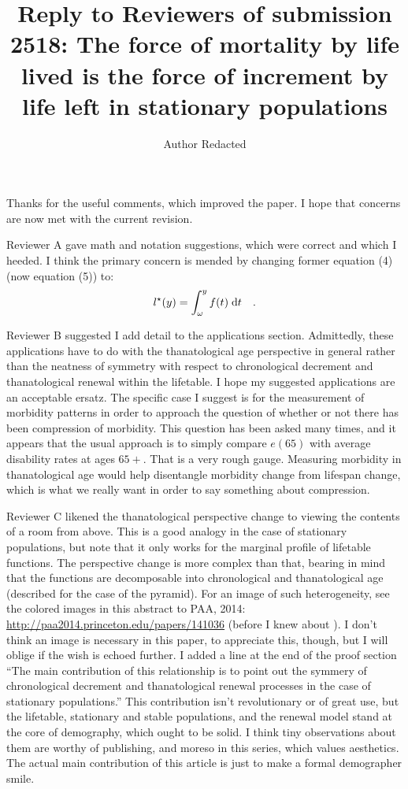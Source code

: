 \documentclass{article}
\newcommand{\dd}{\; \mathrm{d}}
\begin{document}
\title{Reply to Reviewers of submission 2518: The force of mortality by life
lived is the force of increment by life left in stationary populations}
\author{Author Redacted}

Thanks for the useful comments, which improved the paper. I
hope that concerns are now met with the current revision.

Reviewer A gave math and notation suggestions, which were correct and which I
heeded. I think the primary concern is mended by changing former equation (4)
(now equation (5)) to:
\begin{equation}
l^\star (y) = \int _\omega^y f(t) \dd t \notag \quad \text{.} 
\end{equation}

Reviewer B suggested I add detail to the applications section. Admittedly, these
applications have to do with the thanatological age perspective in general
rather than the neatness of symmetry with respect to chronological decrement and
thanatological renewal within the lifetable. I hope my suggested applications
are an acceptable ersatz. The specific case I suggest is for the measurement of
morbidity patterns in order to approach the question of whether or not there
has been compression of morbidity. This question has been asked many times, and
it appears that the usual approach is to simply compare $e(65)$ with average
disability rates at ages $65+$. That is a very rough gauge. Measuring morbidity
in thanatological age would help disentangle morbidity change from lifespan change,
which is what we really want in order to say something about compression.

Reviewer C likened the thanatological perspective change to viewing the contents
of a room from above. This is a good analogy in the case of stationary
populations, but note that it only works for the marginal profile of lifetable
functions. The perspective change is more complex than that, bearing in mind
that the functions are decomposable into chronological and thanatological age
(described for the case of the pyramid). For an image of such heterogeneity, see
the colored images in this abstract to PAA, 2014: \url{http://paa2014.princeton.edu/papers/141036}
(before I knew about \citep{brouard1986structure}). I don't think an image is
necessary in this paper, to appreciate this, though, but I will oblige if the
wish is echoed further. I added a line at the end of the proof section ``The
main contribution of this relationship is to point out the symmery of chronological decrement and thanatological renewal processes in
the case of stationary populations.'' This contribution isn't revolutionary or
of great use, but the lifetable, stationary and stable populations, and the
renewal model stand at the core of demography, which ought to be
solid. I think tiny observations about them are worthy of publishing, and moreso
in this series, which values aesthetics. The actual main contribution of this
article is just to make a formal demographer smile.
\end{document}
